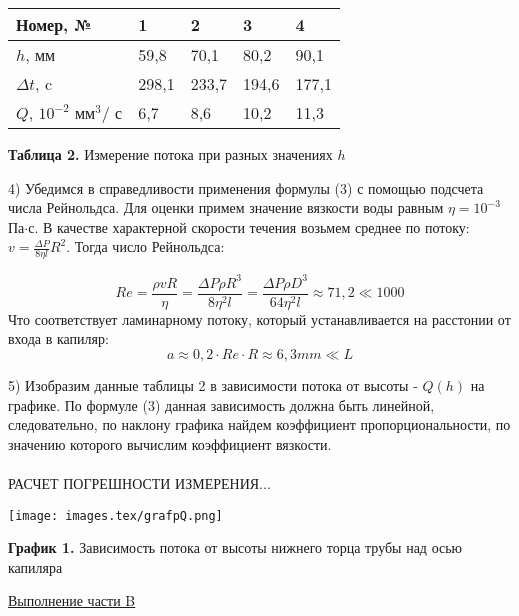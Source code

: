 \documentclass{article}
\begin{document}
\begin{center}
    \begin{tabular}{|m{7em}|m{3em}|m{3em}|m{3em}|m{3em}|}
        \hline
        Номер, №  & 1 & 2 & 3 & 4 \\
        \hline
        \(h\), мм & 59,8 & 70,1 & 80,2 & 90,1 \\
        \hline
        \(\Delta t\), c & 298,1 & 233,7 & 194,6 & 177,1 \\
        \hline
        \(Q\), \(10 ^{-2}\) мм\(^{3}\)/ с & 6,7 & 8,6 & 10,2 & 11,3 \\
        \hline
    \end{tabular}
\end{center}
\begin{center}
    \textbf{Таблица 2.} Измерение потока при разных значениях \(h\)
\end{center}

4) Убедимся в справедливости применения формулы (3) с помощью подсчета числа Рейнольдса. Для оценки примем значение вязкости воды равным \(\eta = 10^{-3}\) Па\(\cdot\)с. В качестве характерной скорости течения возьмем среднее по потоку: \(v = \frac{\Delta P}{8 \eta l} R^{2}\). Тогда число Рейнольдса:

\[
    Re = \frac{\rho v R}{\eta} = \frac{\Delta P \rho R^{3}}{8 \eta^{2} l} = \frac{\Delta P \rho D^{3}}{64 \eta^{2} l} \approx 71,2 \ll 1000
\]
Что соответствует ламинарному потоку, который устанавливается на расстонии от входа в капиляр:
\[
    a \approx 0,2\cdot Re \cdot R \approx 6,3 mm \ll L
\]

5) Изобразим данные таблицы 2 в зависимости потока от высоты - \(Q(h)\) на графике. По формуле (3) данная зависимость должна быть линейной, следовательно, по наклону графика найдем коэффициент пропорциональности, по значению которого вычислим коэффициент вязкости.
\\
\\
РАСЧЕТ ПОГРЕШНОСТИ ИЗМЕРЕНИЯ...

\begin{center}
    \texttt{[image: images.tex/grafpQ.png]}

    \textbf{График 1.} Зависимость потока от высоты нижнего торца трубы над осью капиляра
\end{center}

\begin{center}
    \raggedleft
    {
        \large{\underline{Выполнение части B}}
    }
\end{center}
\end{document}
